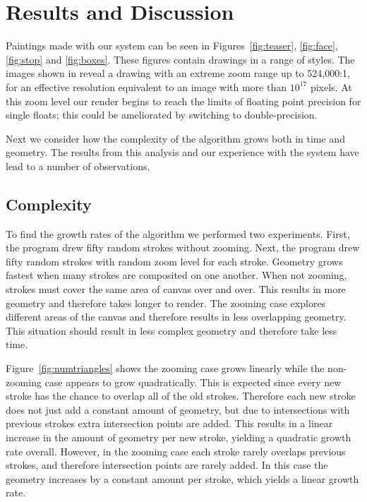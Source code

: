 \documentclass[review]{acmsiggraph}
\begin{document}
\section{Results and Discussion}
Paintings made with our system can be seen in Figures~\ref{fig:teaser}, \ref{fig:face},  \ref{fig:stop} and \ref{fig:boxes}.  
%
These figures contain drawings in a range of styles. The images shown in 
reveal a drawing with an extreme zoom range up to 524,000:1, 
for an effective resolution equivalent to an image with more than $10^{17}$ pixels.
At this zoom level our render begins to reach the limits of floating point precision
for single floats; this could be ameliorated by switching to double-precision.

Next we  consider how the complexity of the algorithm grows both in time and geometry.
The results from this analysis and our experience with the system have lead to a number of observations.

\subsection{Complexity}
To find the growth rates of the algorithm we performed two experiments. 
First, the program drew fifty random strokes without zooming.
Next, the program drew fifty random strokes with random zoom level for each stroke.
Geometry grows fastest when many strokes are composited on one another. When not zooming, strokes
must cover the same area of canvas over and over. This
results in more geometry and therefore takes longer to render. The zooming case explores different
areas of the canvas and therefore results in less overlapping geometry. This situation should result
in less complex geometry and therefore take less time.

Figure~\ref{fig:numtriangles} shows the zooming case grows linearly while the non-zooming case
appears to grow quadratically. This is expected since every new stroke has the chance to overlap
all of the old strokes. Therefore each new stroke does not just add a constant amount of geometry, but 
due to intersections with previous strokes extra intersection points are added. This results in a linear
increase in the amount of geometry per new stroke, yielding a quadratic growth rate overall. 
However, in the zooming case each stroke rarely overlaps previous strokes, and therefore
intersection points are rarely added. In this case the geometry increases by a constant amount per stroke, which yields a linear growth rate.
\end{document}
